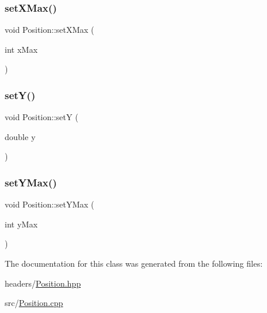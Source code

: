 \mbox{\label{class_position_acb2c50493422d1a6faceb3ed7e2a8caf}} 
\subsubsection{\texorpdfstring{set\+X\+Max()}{setXMax()}}
{\footnotesize\ttfamily void Position\+::set\+X\+Max (\begin{DoxyParamCaption}\item[{int}]{x\+Max }\end{DoxyParamCaption})}

\mbox{\label{class_position_a5fbae78d4986da56edad357a82e1e376}} 
\subsubsection{\texorpdfstring{set\+Y()}{setY()}}
{\footnotesize\ttfamily void Position\+::setY (\begin{DoxyParamCaption}\item[{double}]{y }\end{DoxyParamCaption})}

\mbox{\label{class_position_a715321d96c4195ddb3381b52a6cf547c}} 
\subsubsection{\texorpdfstring{set\+Y\+Max()}{setYMax()}}
{\footnotesize\ttfamily void Position\+::set\+Y\+Max (\begin{DoxyParamCaption}\item[{int}]{y\+Max }\end{DoxyParamCaption})}



The documentation for this class was generated from the following files\+:\begin{DoxyCompactItemize}
\item 
headers/\mbox{\hyperlink{_position_8hpp}{Position.\+hpp}}\item 
src/\mbox{\hyperlink{_position_8cpp}{Position.\+cpp}}\end{DoxyCompactItemize}
